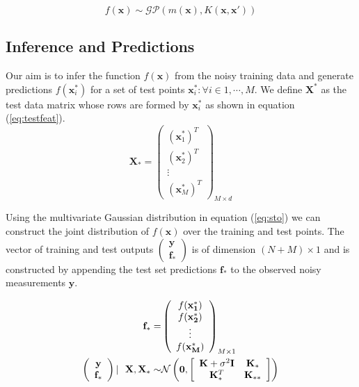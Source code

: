 \begin{equation}
    f(\mathbf{x}) \sim \mathcal{GP}(m(\mathbf{x}), K(\mathbf{x}, \mathbf{x}'))
\end{equation}

\subsection{Inference and Predictions} \label{sec:inference}

Our aim is to infer the function $f(\mathbf{x})$ from the noisy training data and generate predictions $f(\mathbf{x}^{*}_i)$ for a set of test points $ {\mathbf{x}^{*}_i : \forall i \in 1, \cdots, M} $. We define $\mathbf{X}^*$ as the test data matrix whose rows are formed by $\mathbf{x}^{*}_i$ as shown in equation (\ref{eq:testfeat}). 
\begin{equation}
    \mathbf{X}_* = \left( \begin{array}{c} (\mathbf{x}^{*}_1)^T \\ (\mathbf{x}^{*}_2)^T \\ \vdots \\ (\mathbf{x}^{*}_M)^T \end{array} \right)_{M \times d} \label{eq:testfeat} 
\end{equation}

Using the multivariate Gaussian distribution in equation (\ref{eq:sto}) we can construct the joint distribution of $f(\mathbf{x})$ over the training and test points. The vector of training and test outputs $\left( \begin{array}{c} \mathbf{y} \\ \mathbf{f_*} \end{array} \right)$ is of dimension $(N+M) \times 1$ and is constructed by appending the test set predictions $\mathbf{f}_*$ to the observed noisy measurements $\mathbf{y}$.

\begin{align}
    \mathbf{f}_* = & \left( \begin{array}{c} f(\mathbf{x^{*}_1}) \\ f(\mathbf{x^{*}_2}) \\ \vdots \\ f(\mathbf{x^{*}_M}) \end{array} \right)_{M \times 1} \\
     \vspace{4\baselineskip}
    \left( \begin{array}{c} \mathbf{y} \\ \mathbf{f_*} \end{array} \right) | \ \ \mathbf{X}, \mathbf{X}_* \sim & 
    \mathcal{N}\left(\mathbf{0}, \left[ \begin{array}{cc} \mathbf{K} + \sigma^{2} \mathbf{I} & \mathbf{K}_{*} \\ \mathbf{K}_{*}^T & \mathbf{K}_{**} \end{array} \right ] \right) \label{eq:dist}
\end{align}

